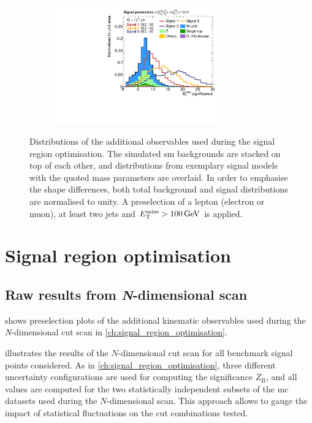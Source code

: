 \begin{figure}
\begin{subfigure}[b]{0.5\linewidth}
	\end{subfigure}\hfill
	\par\medskip
	\begin{subfigure}[b]{0.5\linewidth}
		\centering\includegraphics[width=0.8\textwidth]{presel/metsig}
	\end{subfigure}
	\caption{Distributions of the additional observables used during the signal region optimisation. The simulated \gls{sm} backgrounds are stacked on top of each other, and distributions from exemplary signal models with the quoted mass parameters are overlaid. In order to emphasise the shape differences, both total background and signal distributions are normalised to unity. A preselection of a lepton (electron or muon), at least two jets and $\etmiss > \SI{100}{\GeV}$ is applied.}\label{fig:additional_presel_plots}
\end{figure}

\section{Signal region optimisation}\label{app:n-1_plots_cut_opt}

\graphicspath{{chapter-optimisation/Figs/Vector/}{chapter-optimisation/Figs/}}

\subsection{Raw results from \textit{N}-dimensional scan}

 shows preselection plots of the additional kinematic observables used during the \textit{N}-dimensional cut scan in \cref{ch:signal_region_optimisation}.

 illustrates the results of the $N$-dimensional cut scan for all benchmark signal points considered. As in \cref{ch:signal_region_optimisation}, three different uncertainty configurations are used for computing the significance $Z_\mathrm{B}$, and all values are computed for the two statistically independent subsets of the \gls{mc} datasets used during the $N$-dimensional scan. This approach allows to gauge the impact of statistical fluctuations on the cut combinations tested.

